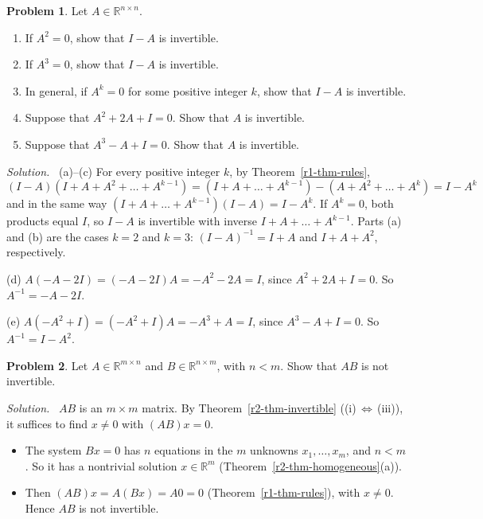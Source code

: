 \documentclass[12pt]{article}
\newcommand{\R}{\mathbb R}
\theoremstyle{definition}
\newtheorem{problem}{Problem}
\newenvironment{solution}{\par\noindent\textit{Solution.}\ }{\par\smallskip}
\begin{document}
\begin{problem}\label{r2-ex-nilpotent}
Let \(A\in\R^{n\times n}\).
\begin{enumerate}
\item If \(A^2=0\), show that \(I-A\) is invertible.
\item If \(A^3=0\), show that \(I-A\) is invertible.
\item In general, if \(A^k=0\) for some positive integer \(k\), show that \(I-A\) is invertible.
\item Suppose that \(A^2+2A+I=0\). Show that \(A\) is invertible.
\item Suppose that \(A^3-A+I=0\). Show that \(A\) is invertible.
\end{enumerate}
\end{problem}
\begin{solution}
(a)--(c) For every positive integer \(k\), by Theorem~\ref{r1-thm-rules},
\[
(I-A)(I+A+A^2+\dots+A^{k-1})=(I+A+\dots+A^{k-1})-(A+A^2+\dots+A^k)=I-A^k
\]
and in the same way \((I+A+\dots+A^{k-1})(I-A)=I-A^k\). If \(A^k=0\), both products equal
\(I\), so \(I-A\) is invertible with inverse \(I+A+\dots+A^{k-1}\). Parts (a) and (b) are the
cases \(k=2\) and \(k=3\): \((I-A)^{-1}=I+A\) and \(I+A+A^2\), respectively.

(d) \(A(-A-2I)=(-A-2I)A=-A^2-2A=I\), since \(A^2+2A+I=0\). So \(A^{-1}=-A-2I\).

(e) \(A(-A^2+I)=(-A^2+I)A=-A^3+A=I\), since \(A^3-A+I=0\). So \(A^{-1}=I-A^2\).
\end{solution}

\begin{problem}\label{r2-pr-shape}
Let \(A\in\R^{m\times n}\) and \(B\in\R^{n\times m}\), with \(n<m\). Show that \(AB\) is not invertible.
\end{problem}
\begin{solution}
\(AB\) is an \(m\times m\) matrix. By Theorem~\ref{r2-thm-invertible} ((i)\,\(\Leftrightarrow\)\,(iii)), it suffices
to find \(x\ne0\) with \((AB)x=0\).
\begin{itemize}
\item The system \(Bx=0\) has \(n\) equations in the \(m\) unknowns \(x_1,\dots,x_m\), and \(n<m\). So it has a
nontrivial solution \(x\in\R^m\) (Theorem~\ref{r2-thm-homogeneous}(a)).
\item Then \((AB)x=A(Bx)=A0=0\) (Theorem~\ref{r1-thm-rules}), with \(x\ne0\). Hence \(AB\) is not invertible.
\end{itemize}
\end{solution}
\end{document}
